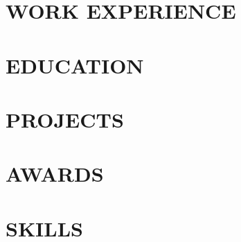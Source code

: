 \documentclass[letterpaper,11pt]{article}
\begin{document}

\vspace{\resumeHeaderGap}

\section{WORK EXPERIENCE}
\resumeEntryListStart
  
  
  
\resumeEntryListEnd

\section{EDUCATION}
\resumeEntryListStart
  
  
\resumeEntryListEnd

\section{PROJECTS}
\resumeEntryListStart
  
  
  
\resumeEntryListEnd

\section{AWARDS}
{\noindent\small

}

\section{SKILLS}
\begin{itemize}[leftmargin=0in, label={}]
  
\end{itemize}
\end{document}
